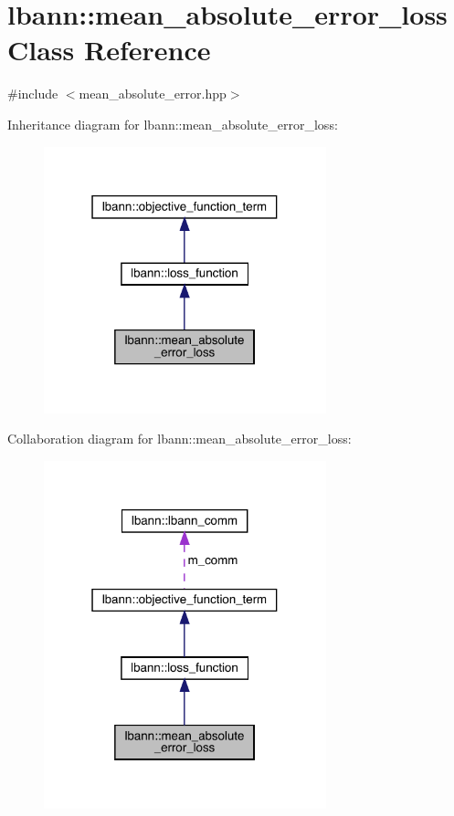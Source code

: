 \hypertarget{classlbann_1_1mean__absolute__error__loss}{}\section{lbann\+:\+:mean\+\_\+absolute\+\_\+error\+\_\+loss Class Reference}
\label{classlbann_1_1mean__absolute__error__loss}


{\ttfamily \#include $<$mean\+\_\+absolute\+\_\+error.\+hpp$>$}



Inheritance diagram for lbann\+:\+:mean\+\_\+absolute\+\_\+error\+\_\+loss\+:\nopagebreak
\begin{figure}[H]
\begin{center}
\leavevmode
\includegraphics[width=232pt]{classlbann_1_1mean__absolute__error__loss__inherit__graph}
\end{center}
\end{figure}


Collaboration diagram for lbann\+:\+:mean\+\_\+absolute\+\_\+error\+\_\+loss\+:\nopagebreak
\begin{figure}[H]
\begin{center}
\leavevmode
\includegraphics[width=232pt]{classlbann_1_1mean__absolute__error__loss__coll__graph}
\end{center}
\end{figure}
